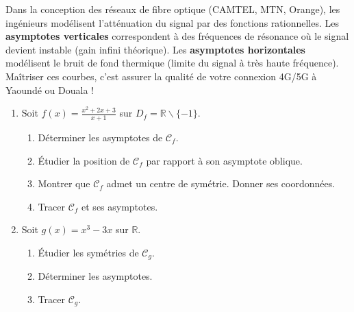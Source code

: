 \documentclass[11pt]{article}
\def\setminus{\mathbin{\backslash}}\let\smallsetminus\setminus
\begin{document}
\begin{savaistu}
Dans la conception des réseaux de fibre optique (CAMTEL, MTN, Orange), les ingénieurs modélisent l'atténuation du signal par des fonctions rationnelles. Les \textbf{asymptotes verticales} correspondent à des fréquences de résonance où le signal devient instable (gain infini théorique). Les \textbf{asymptotes horizontales} modélisent le bruit de fond thermique (limite du signal à très haute fréquence). Maîtriser ces courbes, c'est assurer la qualité de votre connexion 4G/5G à Yaoundé ou Douala !
\end{savaistu}

\begin{exercice}
\begin{enumerate}
\item Soit $f(x)=\frac{x^2+2x+3}{x+1}$ sur $D_f=\mathbb{R}\setminus\{-1\}$.
\begin{enumerate}
\item Déterminer les asymptotes de $\mathcal{C}_f$.
\item Étudier la position de $\mathcal{C}_f$ par rapport à son asymptote oblique.
\item Montrer que $\mathcal{C}_f$ admet un centre de symétrie. Donner ses coordonnées.
\item Tracer $\mathcal{C}_f$ et ses asymptotes.
\end{enumerate}
\item Soit $g(x)=x^3-3x$ sur $\mathbb{R}$.
\begin{enumerate}
\item Étudier les symétries de $\mathcal{C}_g$.
\item Déterminer les asymptotes.
\item Tracer $\mathcal{C}_g$.
\end{enumerate}
\end{enumerate}
\end{exercice}
\end{document}
